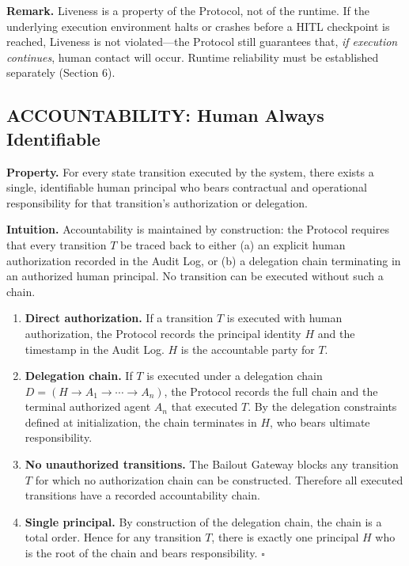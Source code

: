 \textbf{Remark.} Liveness is a property of the Protocol, not of the runtime. If the underlying execution environment halts or crashes before a HITL checkpoint is reached, Liveness is not violated---the Protocol still guarantees that, \textit{if execution continues}, human contact will occur. Runtime reliability must be established separately (Section 6).

\subsection{ACCOUNTABILITY: Human Always Identifiable}

\textbf{Property.} For every state transition executed by the system, there exists a single, identifiable human principal who bears contractual and operational responsibility for that transition's authorization or delegation.

\textbf{Intuition.} Accountability is maintained by construction: the Protocol requires that every transition $T$ be traced back to either (a) an explicit human authorization recorded in the Audit Log, or (b) a delegation chain terminating in an authorized human principal. No transition can be executed without such a chain.

\begin{Proof}[Sketch]
\begin{enumerate}
    \item \textbf{Direct authorization.} If a transition $T$ is executed with human authorization, the Protocol records the principal identity $H$ and the timestamp in the Audit Log. $H$ is the accountable party for $T$.
    \item \textbf{Delegation chain.} If $T$ is executed under a delegation chain $D = (H \rightarrow A_1 \rightarrow \cdots \rightarrow A_n)$, the Protocol records the full chain and the terminal authorized agent $A_n$ that executed $T$. By the delegation constraints defined at initialization, the chain terminates in $H$, who bears ultimate responsibility.
    \item \textbf{No unauthorized transitions.} The Bailout Gateway blocks any transition $T$ for which no authorization chain can be constructed. Therefore all executed transitions have a recorded accountability chain.
    \item \textbf{Single principal.} By construction of the delegation chain, the chain is a total order. Hence for any transition $T$, there is exactly one principal $H$ who is the root of the chain and bears responsibility. $\square$
\end{enumerate}
\end{Proof}

